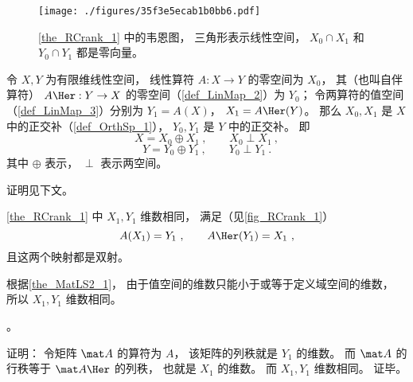 

\begin{figure}[ht]
\centering
\texttt{[image: ./figures/35f3e5ecab1b0bb6.pdf]}
\caption{\autoref{the_RCrank_1} 中的韦恩图， 三角形表示线性空间， $X_0\cap X_1$ 和 $Y_0\cap  Y_1$ 都是零向量。} \label{fig_RCrank_1}
\end{figure}

\begin{theorem}{}\label{the_RCrank_1}
令 $X, Y$ 为有限维线性空间， 线性算符 $A:X \to Y$ 的零空间为 $X_0$， 其（也叫自伴算符） $A\Her: Y \to X$ 的零空间（\autoref{def_LinMap_2}）为 $Y_0$； 令两算符的值空间（\autoref{def_LinMap_3}）分别为 $Y_1 = A(X)$， $X_1 = A\Her(Y)$。 那么 $X_0, X_1$ 是 $X$ 中的正交补（\autoref{def_OrthSp_1}）， $Y_0, Y_1$ 是 $Y$ 中的正交补。 即
\begin{equation}
X = X_0 \oplus X_1~, \qquad X_0 \perp X_1~,
\end{equation}
\begin{equation}
Y = Y_0 \oplus Y_1~, \qquad Y_0 \perp Y_1~.
\end{equation}
其中 $\oplus$ 表示， $\perp$ 表示两空间。
\end{theorem}
证明见下文。

\begin{corollary}{}
\autoref{the_RCrank_1} 中 $X_1, Y_1$ 维数相同， 满足（见\autoref{fig_RCrank_1}）
\begin{equation}\label{eq_RCrank_3}
A(X_1) = Y_1~, \qquad A\Her (Y_1) = X_1~,
\end{equation}
且这两个映射都是双射。
\end{corollary}
根据\autoref{the_MatLS2_1}， 
由于值空间的维数只能小于或等于定义域空间的维数， 所以 $X_1, Y_1$ 维数相同。

\begin{corollary}{}\label{cor_RCrank_1}
。
\end{corollary}
证明： 令矩阵 $\mat A$ 的算符为 $A$， 该矩阵的列秩就是 $Y_1$ 的维数。 而 $\mat A$ 的行秩等于 $\mat A\Her$ 的列秩， 也就是 $X_1$ 的维数。 而 $X_1, Y_1$ 维数相同。 证毕。

